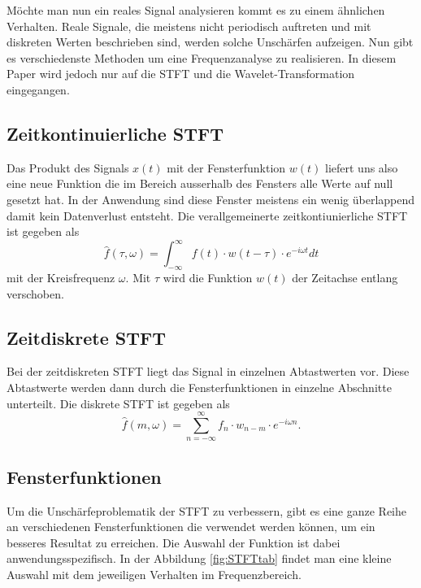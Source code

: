 Möchte man nun ein reales Signal analysieren kommt es zu einem ähnlichen Verhalten. Reale Signale, die meistens nicht periodisch auftreten und mit diskreten Werten beschrieben sind, werden solche Unschärfen aufzeigen. Nun gibt es verschiedenste Methoden um eine Frequenzanalyse zu realisieren. In diesem Paper wird jedoch nur auf die STFT und die Wavelet-Transformation eingegangen. 


\subsection{Zeitkontinuierliche STFT}

Das Produkt des Signals $x(t)$ mit der Fensterfunktion $w(t) $ liefert uns also eine neue Funktion die im Bereich ausserhalb des Fensters alle Werte auf null gesetzt hat. In der Anwendung sind diese Fenster meistens ein wenig überlappend damit kein Datenverlust entsteht. Die verallgemeinerte zeitkontiunierliche STFT ist  gegeben als
\[
	\hat{f}(\tau, \omega)=\int_{-\infty}^{\infty} f(t)\cdot w(t-\tau)\cdot e^{-i \omega t} dt
\]
mit der Kreisfrequenz  $\omega $. Mit $\tau$ wird die Funktion $w(t)$ der Zeitachse entlang verschoben.

\subsection{Zeitdiskrete STFT}
Bei der zeitdiskreten STFT liegt das Signal in einzelnen Abtastwerten vor. Diese Abtastwerte werden dann durch die Fensterfunktionen in einzelne Abschnitte unterteilt. Die diskrete STFT ist gegeben als
\[
	\hat{f}(m, \omega)=\sum_{n=-\infty}^{\infty} f_{n} \cdot w_{n-m}\cdot e^{-i \omega n}.
\]


\subsection{Fensterfunktionen}
Um die Unschärfeproblematik der STFT zu verbessern, gibt es eine ganze Reihe an verschiedenen Fensterfunktionen die verwendet werden können, um ein besseres Resultat zu erreichen. Die Auswahl der Funktion ist dabei anwendungsspezifisch. In der Abbildung \ref{fig:STFTtab} findet man eine kleine Auswahl mit dem jeweiligen Verhalten im Frequenzbereich. 


